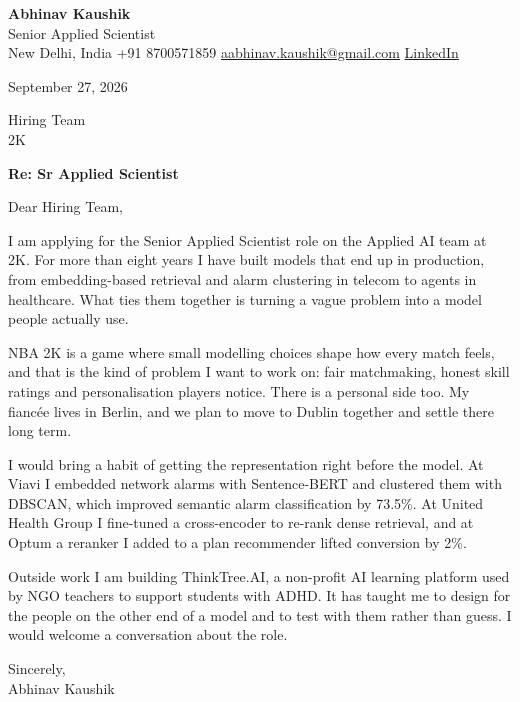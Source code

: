 \documentclass[11pt,a4paper]{article}
\begin{document}
{\Large\bfseries Abhinav Kaushik}\\
Senior Applied Scientist\\
New Delhi, India \textbar{} +91 8700571859 \textbar{} \href{mailto:aabhinav.kaushik@gmail.com}{aabhinav.kaushik@gmail.com} \textbar{} \href{https://www.linkedin.com/in/abhinav-kaushik10/}{LinkedIn}  

September 27, 2026

Hiring Team\\
2K

\textbf{Re: Sr Applied Scientist}

Dear Hiring Team,

I am applying for the Senior Applied Scientist role on the Applied AI team at 2K. For more than eight years I have built models that end up in production, from embedding-based retrieval and alarm clustering in telecom to agents in healthcare. What ties them together is turning a vague problem into a model people actually use.

NBA 2K is a game where small modelling choices shape how every match feels, and that is the kind of problem I want to work on: fair matchmaking, honest skill ratings and personalisation players notice. There is a personal side too. My fiancée lives in Berlin, and we plan to move to Dublin together and settle there long term.

I would bring a habit of getting the representation right before the model. At Viavi I embedded network alarms with Sentence-BERT and clustered them with DBSCAN, which improved semantic alarm classification by 73.5\%. At United Health Group I fine-tuned a cross-encoder to re-rank dense retrieval, and at Optum a reranker I added to a plan recommender lifted conversion by 2\%.

Outside work I am building ThinkTree.AI, a non-profit AI learning platform used by NGO teachers to support students with ADHD. It has taught me to design for the people on the other end of a model and to test with them rather than guess. I would welcome a conversation about the role.

Sincerely,\\[4pt]
Abhinav Kaushik
\end{document}
